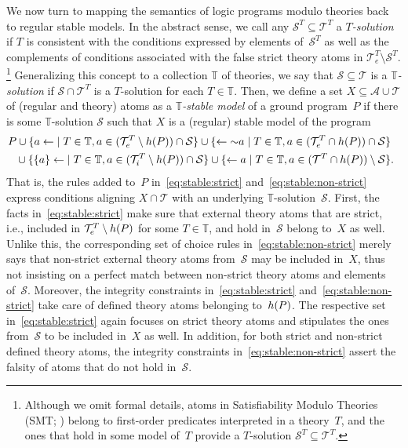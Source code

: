 We now turn to mapping the semantics of logic programs modulo theories back to regular stable models.
In the abstract sense, we call any $\mathcal{S}^T\subseteq\mathcal{T}^T$ a \emph{$T$-solution}
if $T$ is consistent with the conditions expressed by elements of~$\mathcal{S}^T$ as well as the complements of
conditions associated with the false strict theory atoms in $\mathcal{T}^T_e\setminus \mathcal{S}^T$.%
\footnote{%
  Although we omit formal details, atoms in
  Satisfiability Modulo Theories (SMT; \cite{baseseti09a})
  belong to first-order predicates interpreted in a theory~$T$,
  and the ones that hold in some model of~$T$ provide a $T$-solution $\mathcal{S}^T\subseteq\mathcal{T}^T$.}
Generalizing this concept to a collection $\mathbb{T}$ of theories,
we say that $\mathcal{S}\subseteq\mathcal{T}$ is a \emph{$\mathbb{T}$-solution} if
$\mathcal{S}\cap\mathcal{T}^T$ is a $T$-solution for each $T\in\mathbb{T}$.
Then, we define a set $X\subseteq\mathcal{A}\cup\mathcal{T}$ of (regular and theory) atoms
as a \emph{$\mathbb{T}$-stable model} of a ground program~$P$ if
there is some $\mathbb{T}$-solution $\mathcal{S}$ such that
$X$ is a (regular) stable model of the program
%
\begin{align}%
\neghspace
P
\cup
\{{a\leftarrow}       \mid T\in\mathbb{T},a\in (\mathcal{T}^T_e\setminus\head{P})\cap \mathcal{S}\}
\cup
\{ {\leftarrow\naf{a}}\mid T\in\mathbb{T},a\in (\mathcal{T}^T_e\cap\head{P})\cap \mathcal{S}\}
\label{eq:stable:strict}
\\
\neghspace
{}\cup
\{{\{a\}\leftarrow}   \mid T\in\mathbb{T},a\in (\mathcal{T}^T_i\setminus\head{P})\cap \mathcal{S}\}
\cup
\{ {\leftarrow{a}}    \mid T\in\mathbb{T},a\in (\mathcal{T}^T\cap\head{P})\setminus \mathcal{S}\}\rlap{.}
\label{eq:stable:non-strict}
\end{align}
%
That is, the rules added to~$P$ in~\eqref{eq:stable:strict} and~\eqref{eq:stable:non-strict}
express conditions aligning $X\cap\mathcal{T}$ with an underlying $\mathbb{T}$-solution~$\mathcal{S}$.
First, the facts in~\eqref{eq:stable:strict} make sure that external theory atoms
that are strict, i.e., included in $\mathcal{T}^T_e\setminus h(P)$ for some $T\in\mathbb{T}$,
and hold in~$\mathcal{S}$ belong to~$X$ as well.
Unlike this, the corresponding set of choice rules in~\eqref{eq:stable:non-strict}
merely says that non-strict external theory atoms from~$\mathcal{S}$ may be included in~$X$,
thus not insisting on a perfect match between non-strict theory atoms and elements of~$\mathcal{S}$.
Moreover, the integrity constraints in~\eqref{eq:stable:strict} and~\eqref{eq:stable:non-strict}
take care of defined theory atoms belonging to~$h(P)$.
The respective set in~\eqref{eq:stable:strict} again focuses on strict theory atoms and
stipulates the ones from~$\mathcal{S}$ to be included in~$X$ as well.
In addition, for both strict and non-strict defined theory atoms,
the integrity constraints in~\eqref{eq:stable:non-strict} assert the falsity
of atoms that do not hold in~$\mathcal{S}$.


